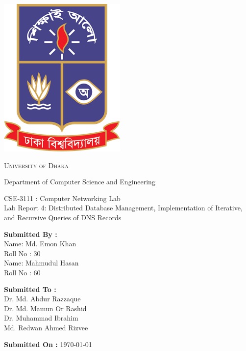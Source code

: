 \documentclass[11pt]{article}
\newcommand{\labNo}{4}
\newcommand{\labTitle}{Distributed Database Management, Implementation of Iterative, and Recursive Queries of DNS Records}
\begin{document}
\begin{titlepage}
    \begin{center}
        \includegraphics[scale=0.35]{du_logo.png}\par
        \begin{Huge}
            \textsc{University of Dhaka}\par
        \end{Huge}
        \begin{Large}
            Department of Computer Science and Engineering\par \vspace{1cm}
            CSE-3111 : Computer Networking Lab \\[12pt]    
            Lab Report \labNo : \labTitle
        \end{Large}
    \end{center}
    
    \vfill
    
    \begin{large}
        \begin{multicols}{2}
            \textbf{Submitted By :\\[12pt]}
                Name: Md. Emon Khan\\[8pt]
                Roll No : 30\\[12pt]
                Name: Mahmudul Hasan\\[8pt]
                Roll No : 60\\[12pt]
                
            \columnbreak
            
            \noindent
            \textbf{Submitted To :\\[12pt]}
                Dr. Md. Abdur Razzaque\\[12pt]
                Dr. Md. Mamun Or Rashid\\[12pt]
                Dr. Muhammad Ibrahim\\[12pt]
                Md. Redwan Ahmed Rizvee
        \end{multicols}    
    \end{large} 
    
\textbf{Submitted On :} \today\\[20pt]

\end{titlepage}
\end{document}
